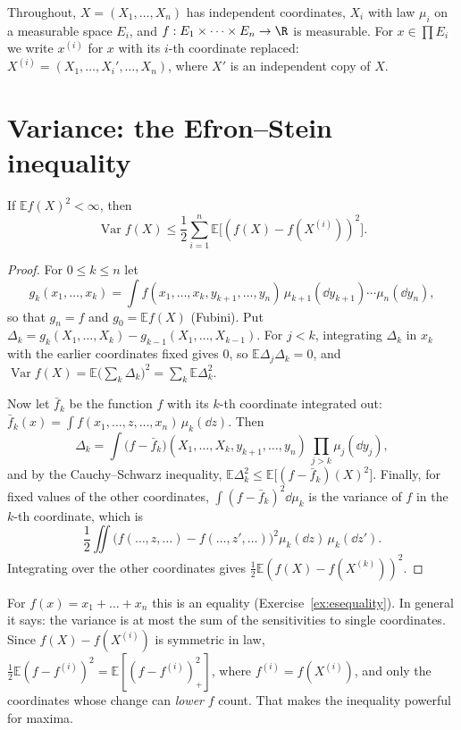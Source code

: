 Throughout, $X=(X_1,\dots,X_n)$ has independent coordinates, $X_i$ with law $\mu_i$ on a measurable space $E_i$, and $f:E_1\times\dots\times E_n\to\R$ is measurable. For
$x\in\prod E_i$ we write $x^{(i)}$ for $x$ with its $i$-th coordinate replaced: $X^{(i)}=(X_1,\dots,X_i',\dots,X_n)$, where $X'$ is an independent copy of $X$.

\section{Variance: the Efron--Stein inequality}

\begin{theorem}\label{thm:efronstein}
If $\mathbb Ef(X)^2<\infty$, then
\[
\operatorname{Var}f(X)\le\frac12\sum_{i=1}^n\mathbb E\bigl[(f(X)-f(X^{(i)}))^2\bigr].
\]
\end{theorem}
\begin{proof}
For $0\le k\le n$ let
\[
g_k(x_1,\dots,x_k)=\int f(x_1,\dots,x_k,y_{k+1},\dots,y_n)\,\mu_{k+1}(\dd y_{k+1})\cdots\mu_n(\dd y_n),
\]
so that $g_n=f$ and $g_0=\mathbb Ef(X)$ (Fubini). Put $\Delta_k=g_k(X_1,\dots,X_k)-g_{k-1}(X_1,\dots,X_{k-1})$. For $j<k$, integrating $\Delta_k$ in $x_k$ with the earlier coordinates fixed gives $0$, so
$\mathbb E\Delta_j\Delta_k=0$, and $\operatorname{Var}f(X)=\mathbb E\bigl(\sum_k\Delta_k\bigr)^2=\sum_k\mathbb E\Delta_k^2$.

Now let $\bar f_k$ be the function $f$ with its $k$-th coordinate integrated out: $\bar f_k(x)=\int f(x_1,\dots,z,\dots,x_n)\,\mu_k(\dd z)$. Then
\[
\Delta_k=\int\bigl(f-\bar f_k\bigr)(X_1,\dots,X_k,y_{k+1},\dots,y_n)\,\prod_{j>k}\mu_j(\dd y_j),
\]
and by the Cauchy--Schwarz inequality,
$\mathbb E\Delta_k^2\le\mathbb E\bigl[(f-\bar f_k)(X)^2\bigr]$. Finally, for fixed values of the other coordinates, $\int(f-\bar f_k)^2\dd\mu_k$ is the variance of $f$ in the $k$-th
coordinate, which is
\[
\frac12\iint\bigl(f(\dots,z,\dots)-f(\dots,z',\dots)\bigr)^2\mu_k(\dd z)\,\mu_k(\dd z').
\]
Integrating over the other coordinates gives $\frac12\mathbb E(f(X)-f(X^{(k)}))^2$.
\end{proof}

For $f(x)=x_1+\dots+x_n$ this is an equality (Exercise~\ref{ex:esequality}). In general it says: the variance is at most the sum of the sensitivities to single coordinates.
Since $f(X)-f(X^{(i)})$ is symmetric in law, $\frac12\mathbb E(f-f^{(i)})^2=\mathbb E[(f-f^{(i)})_+^2]$, where $f^{(i)}=f(X^{(i)})$, and only the coordinates whose change can \emph{lower}
$f$ count. That makes the inequality powerful for maxima.

